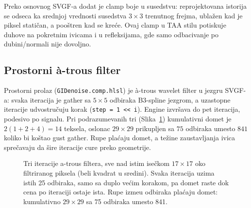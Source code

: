 Preko osnovnog SVGF-a dodat je clamp boje u susedstvu: reprojektovana istorija se odseca ka srednjoj vrednosti susedstva $3\times3$ trenutnog frejma, ubla\v{z}en kad je piksel stati\v{c}an, a poo\v{s}tren kad se kre\'ce. Ovaj clamp u TAA stilu potiskuje duhove na pokretnim ivicama i u refleksijama, gde samo odbacivanje po dubini/normali nije dovoljno.

\subsection{Prostorni \`a-trous filter}

Prostorni prolaz (\texttt{GIDenoise.comp.hlsl}) je \`a-trous wavelet filter u jezgru SVGF-a: svaka iteracija je gather sa $5\times5$ odbiraka B3-spline jezgrom, a uzastopne iteracije udvostru\v{c}uju korak (\texttt{step = 1 << i}). Engine izvr\v{s}ava do pet iteracija, podesivo po signalu. Pri podrazumevanih tri (Slika~\ref{fig:atrous}) kumulativni domet je $2(1+2+4) = 14$ teksela, oslonac $29\times29$ prikupljen sa $75$ odbiraka umesto $841$ koliko bi ko\v{s}tao gust gather. Rupe pla\'caju domet, a te\v{z}ine zaustavljanja ivica spre\v{c}avaju da \v{s}ire iteracije cure preko geometrije.

\begin{figure}[tbp]
\centering
{}
\caption[\`A-trous: rastu\'ci korak i domet filtera]{Tri iteracije a-trous filtera, sve nad istim ise\v{c}kom $17\times17$ oko filtriranog piksela (beli kvadrat u sredini). Svaka iteracija uzima istih 25 odbiraka, samo sa duplo ve\'cim korakom, pa domet raste dok cena po iteraciji ostaje ista. Rupe izme\dj{}u odbiraka pla\'caju domet: kumulativno $29\times29$ sa 75 odbiraka umesto 841.}
\label{fig:atrous}
\end{figure}

